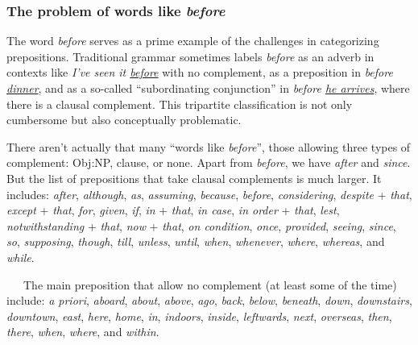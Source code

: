 \subsubsection*{The problem of words like \textit{before}} \label{sec:likebefore}

The word \textit{before} serves as a prime example of the challenges in categorizing prepositions. Traditional grammar sometimes labels \textit{before} as an adverb in contexts like \textit{I've seen it \uline{before}} with no complement, as a preposition in \textit{before \uline{dinner}}, and as a so-called ``subordinating conjunction'' in \textit{before \uline{he arrives}}, where there is a clausal complement. This tripartite classification is not only cumbersome but also conceptually problematic.

\begin{tcolorbox}[title=Words like \textit{before}, colback=white]
    There aren't actually that many  ``words like \textit{before}'', those allowing three types of complement: Obj:NP, clause, or none. Apart from \textit{before}, we have \textit{after} and \textit{since}. But the list of prepositions that take clausal complements is much larger. It includes: \textit{after}, \textit{although}, \textit{as}, \textit{assuming}, 
        \textit{because}, \textit{before}, 
        \textit{considering}, 
        \textit{despite} + \textit{that}, 
        \textit{except} + \textit{that}, 
        \textit{for},
        \textit{given}, 
        \textit{if}, \textit{in} + \textit{that}, \textit{in case}, \textit{in order} + \textit{that}, 
        \textit{lest}, \textit{notwithstanding} + \textit{that}, \textit{now} + \textit{that}, \textit{on condition}, \textit{once}, 
        \textit{provided}, \textit{seeing}, \textit{since}, \textit{so}, \textit{supposing}, 
        \textit{though}, \textit{till}, 
        \textit{unless}, \textit{until}, 
        \textit{when}, \textit{whenever}, \textit{where}, \textit{whereas}, and \textit{while}.

    ~~~The main preposition that allow no complement (at least some of the time) include:
    \textit{a priori}, \textit{aboard}, \textit{about}, \textit{above}, \textit{ago}, \textit{back}, \textit{below}, \textit{beneath}, \textit{down}, \textit{downstairs}, \textit{downtown}, \textit{east}, \textit{here}, \textit{home}, \textit{in}, \textit{indoors}, \textit{inside}, \textit{leftwards}, \textit{next}, \textit{overseas}, \textit{then}, \textit{there}, \textit{when}, \textit{where}, and \textit{within}.
\end{tcolorbox}

